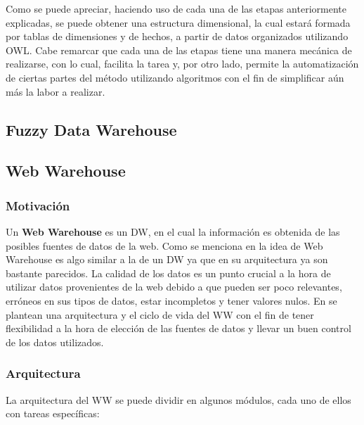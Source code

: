 \documentclass[a4paper,11pt]{article}
\begin{document}
    
    Como se puede apreciar, haciendo uso de cada una de las etapas anteriormente explicadas, se puede obtener una estructura dimensional, la cual estará
    formada por tablas de dimensiones y de hechos, a partir de datos organizados utilizando OWL. Cabe remarcar que cada una de las etapas tiene una manera
    mecánica de realizarse, con lo cual, facilita la tarea y, por otro lado, permite la automatización de ciertas partes del método utilizando algoritmos con el
    fin de simplificar aún más la labor a realizar.
    
    \subsection{Fuzzy Data Warehouse}
    
    
    \subsection{Web Warehouse}
    
    \subsubsection{Motivación}
    
    Un \textbf{Web Warehouse} es un DW, en el cual la información es obtenida de las posibles fuentes de datos de la web. Como se menciona en \cite{webwarehouse}
    la idea de Web Warehouse es algo similar a la de un DW ya que en su arquitectura ya son bastante parecidos. La calidad de los datos es un punto crucial a la
    hora de utilizar datos provenientes de la web debido a que pueden ser poco relevantes, erróneos en sus tipos de datos, estar incompletos y tener valores
    nulos. En \cite{webwarehouse} se plantean una arquitectura y el ciclo de vida del WW con el fin de tener flexibilidad a la hora de elección de las fuentes de
    datos y llevar un buen control de los datos utilizados.
    
    
    \subsubsection{Arquitectura}
    
    La arquitectura del WW se puede dividir en algunos módulos, cada uno de ellos con tareas específicas:
    
\end{document}
